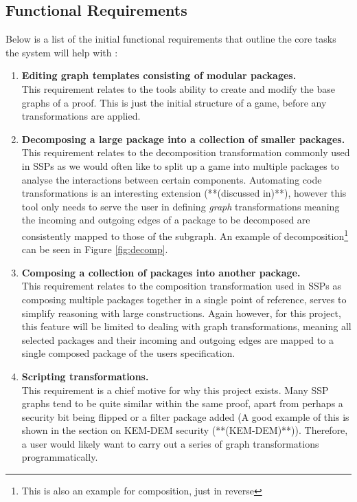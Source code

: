 \documentclass[bsc,frontabs,singlespacing,parskip,deptreport]{infthesis}
\begin{document}
\subsection{Functional Requirements}
Below is a list of the initial functional requirements that outline the core tasks the system will help with :

\begin{enumerate}
    \item \textbf{Editing graph templates consisting of modular packages.}\\
    This requirement relates to the tools ability to create and modify the base graphs of a proof. This is just the initial structure of a game, before any transformations are applied.
    
    \item \textbf{Decomposing a large package into a collection of smaller packages.}\\
    This requirement relates to the decomposition transformation commonly used in SSPs as we would often like to split up a game into multiple packages to analyse the interactions between certain components. Automating code transformations is an interesting extension (**(discussed in)**), however this tool only needs to serve the user in defining \textit{graph} transformations meaning the incoming and outgoing edges of a package to be decomposed are consistently mapped to those of the subgraph. An example of decomposition\footnote{This is also an example for composition, just in reverse} can be seen in Figure \ref{fig:decomp}.

    \item \textbf{Composing a collection of packages into another package.}\\
    This requirement relates to the composition transformation used in SSPs as composing multiple packages together in a single point of reference, serves to simplify reasoning with large constructions. Again however, for this project, this feature will be limited to dealing with graph transformations, meaning all selected packages and their incoming and outgoing edges are mapped to a single composed package of the users specification.   
    
    \item \textbf{Scripting transformations.}\\
    This requirement is a chief motive for why this project exists. Many SSP graphs tend to be quite similar within the same proof, apart from perhaps a security bit being flipped or a filter package added (A good example of this is shown in the section on KEM-DEM security (**(KEM-DEM)**)). Therefore, a user would likely want to carry out a series of graph transformations programmatically.      
    

\end{enumerate}
\end{document}
